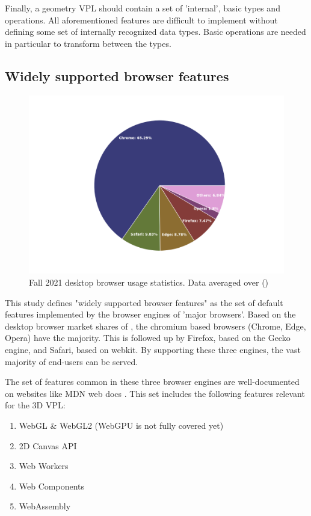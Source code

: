 Finally, a geometry VPL should contain a set of 'internal', basic types and operations.
All aforementioned features are difficult to implement without defining some set of internally recognized data types. 
Basic operations are needed in particular to transform between the types.

\subsection{Widely supported browser features}

\begin{figure}
  \centering
  \graphicspath{ {../../assets/plots/browser-usage/} }
  \includegraphics[width=0.7\linewidth]{plot.png}
  \caption[Browser usage]{Fall 2021 desktop browser usage statistics. Data averaged over (\citep{dashiki_simple_2020,w3counter_global_2020,the_netmarketshare_team_browser_2020,statcounter_global_stats_browser_2020})}
  \label{fig:browser-usage}
\end{figure}

This study defines "widely supported browser features" as the set of default features implemented by the browser engines of 'major browsers'. 
Based on the desktop browser market shares of , the chromium based browsers (Chrome, Edge, Opera) have the majority. 
This is followed up by Firefox, based on the Gecko engine, and Safari, based on webkit. 
By supporting these three engines, the vast majority of end-users can be served.

The set of features common in these three browser engines are well-documented on websites like MDN web docs \citep{mozilla_mdn_2022}. 
This set includes the following features relevant for the 3D VPL:
\begin{enumerate}[-]
  \item WebGL \& WebGL2 (WebGPU is not fully covered yet)
  \item 2D Canvas API
  \item Web Workers
  \item Web Components
  \item WebAssembly
\end{enumerate}

